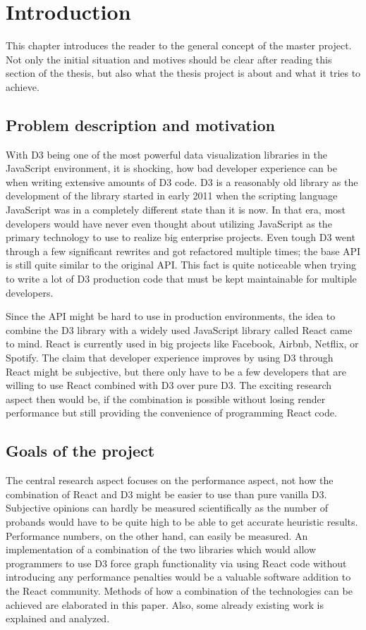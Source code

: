 \chapter{Introduction}
\label{cha:Introduction}

This chapter introduces the reader to the general concept of the master project. Not only the initial situation and motives should be clear after reading this section of the thesis, but also what the thesis project is about and what it tries to achieve.

\section{Problem description and motivation}

With D3 being one of the most powerful data visualization libraries in the JavaScript environment, it is shocking, how bad developer experience can be when writing extensive amounts of D3 code. D3 is a reasonably old library as the development of the library started in early 2011 when the scripting language JavaScript was in a completely different state than it is now. In that era, most developers would have never even thought about utilizing JavaScript as the primary technology to use to realize big enterprise projects. Even tough D3 went through a few significant rewrites and got refactored multiple times; the base API is still quite similar to the original API. This fact is quite noticeable when trying to write a lot of D3 production code that must be kept maintainable for multiple developers.

Since the API might be hard to use in production environments, the idea to combine the D3 library with a widely used JavaScript library called React came to mind. React is currently used in big projects like Facebook, Airbnb, Netflix, or Spotify. The claim that developer experience improves by using D3 through React might be subjective, but there only have to be a few developers that are willing to use React combined with D3 over pure D3. The exciting research aspect then would be, if the combination is possible without losing render performance but still providing the convenience of programming React code.

\section{Goals of the project}

The central research aspect focuses on the performance aspect, not how the combination of React and D3 might be easier to use than pure vanilla D3. Subjective opinions can hardly be measured scientifically as the number of probands would have to be quite high to be able to get accurate heuristic results. Performance numbers, on the other hand, can easily be measured. An implementation of a combination of the two libraries which would allow programmers to use D3 force graph functionality via using React code without introducing any performance penalties would be a valuable software addition to the React community. Methods of how a combination of the technologies can be achieved are elaborated in this paper. Also, some already existing work is explained and analyzed.

